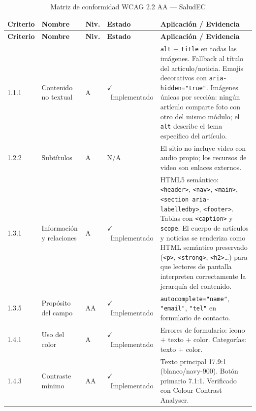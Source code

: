 \documentclass[12pt, a4paper]{article}
\newcommand{\cmark}{\textcolor{successgreen}{$\checkmark$}}
\begin{document}
\begin{longtable}{@{}>{\ttfamily\small}p{1.2cm} p{3.2cm} >{\centering\arraybackslash}p{0.9cm} >{\centering\arraybackslash\small}p{2.5cm} p{5.5cm}@{}}
\caption{Matriz de conformidad WCAG 2.2 AA --- SaludEC} \\
\toprule
\rowcolor{royalblue!12}
\textbf{Criterio} & \textbf{Nombre} & \textbf{Niv.} & \textbf{Estado} & \textbf{Aplicación / Evidencia} \\
\midrule
\endfirsthead
\toprule
\rowcolor{royalblue!12}
\textbf{Criterio} & \textbf{Nombre} & \textbf{Niv.} & \textbf{Estado} & \textbf{Aplicación / Evidencia} \\
\midrule
\endhead
\bottomrule
\endlastfoot

1.1.1 & Contenido no textual & A & \textcolor{successgreen}{\cmark~Implementado} & \texttt{alt} + \texttt{title} en todas las imágenes. Fallback al título del artículo/noticia. Emojis decorativos con \texttt{aria-hidden="true"}. Imágenes únicas por sección: ningún artículo comparte foto con otro del mismo módulo; el \texttt{alt} describe el tema específico del artículo. \\

1.2.2 & Subtítulos & A & \textcolor{graymid}{N/A} & El sitio no incluye video con audio propio; los recursos de video son enlaces externos. \\

1.3.1 & Información y relaciones & A & \textcolor{successgreen}{\cmark~Implementado} & HTML5 semántico: \texttt{<header>}, \texttt{<nav>}, \texttt{<main>}, \texttt{<section aria-labelledby>}, \texttt{<footer>}. Tablas con \texttt{<caption>} y \texttt{scope}. El cuerpo de artículos y noticias se renderiza como HTML semántico preservado (\texttt{<p>}, \texttt{<strong>}, \texttt{<h2>}…) para que lectores de pantalla interpreten correctamente la jerarquía del contenido. \\

1.3.5 & Propósito del campo & AA & \textcolor{successgreen}{\cmark~Implementado} & \texttt{autocomplete="name"}, \texttt{"email"}, \texttt{"tel"} en formulario de contacto. \\

1.4.1 & Uso del color & A & \textcolor{successgreen}{\cmark~Implementado} & Errores de formulario: icono $+$ texto $+$ color. Categorías: texto $+$ color. \\

1.4.3 & Contraste mínimo & AA & \textcolor{successgreen}{\cmark~Implementado} & Texto principal 17.9:1 (blanco/navy-900). Botón primario 7.1:1. Verificado con Colour Contrast Analyser. \\


\end{longtable}
\end{document}
